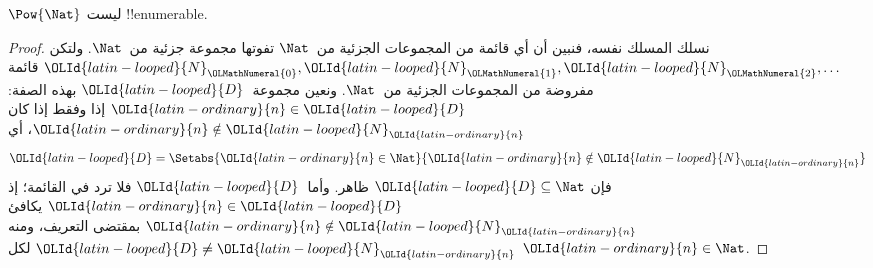 \documentclass[../../../include/open-logic-section]{subfiles}
\begin{document}
\begin{thm}
$\Pow{\Nat}$ ليست !!{enumerable}.
\end{thm}

\begin{proof}
نسلك المسلك نفسه، فنبين أن أي قائمة من المجموعات الجزئية من~$\Nat$ تفوتها مجموعة جزئية من~$\Nat$. ولتكن ${\OLId{latin-looped}{N}}_{\OLMathNumeral{0}}, {\OLId{latin-looped}{N}}_{\OLMathNumeral{1}}, {\OLId{latin-looped}{N}}_{\OLMathNumeral{2}}, \ldots$ قائمة مفروضة من المجموعات الجزئية من~$\Nat$. ونعين مجموعة~${\OLId{latin-looped}{D}}$ بهذه الصفة: ${\OLId{latin-ordinary}{n}} \in {\OLId{latin-looped}{D}}$ إذا وفقط إذا كان ${\OLId{latin-ordinary}{n}} \notin
{\OLId{latin-looped}{N}}_{{\OLId{latin-ordinary}{n}}}$، أي
\[
{\OLId{latin-looped}{D}} = \Setabs{{\OLId{latin-ordinary}{n}} \in \Nat}{{\OLId{latin-ordinary}{n}} \notin {\OLId{latin-looped}{N}}_{\OLId{latin-ordinary}{n}}}
\]
فإن ${\OLId{latin-looped}{D}}\subseteq \Nat$ ظاهر. وأما~${\OLId{latin-looped}{D}}$ فلا ترد في القائمة؛ إذ ${\OLId{latin-ordinary}{n}} \in {\OLId{latin-looped}{D}}$ يكافئ ${\OLId{latin-ordinary}{n}}\notin {\OLId{latin-looped}{N}}_{\OLId{latin-ordinary}{n}}$ بمقتضى التعريف، ومنه ${\OLId{latin-looped}{D}} \neq {\OLId{latin-looped}{N}}_{\OLId{latin-ordinary}{n}}$ لكل ${\OLId{latin-ordinary}{n}} \in \Nat$.
\end{proof}
\end{document}
